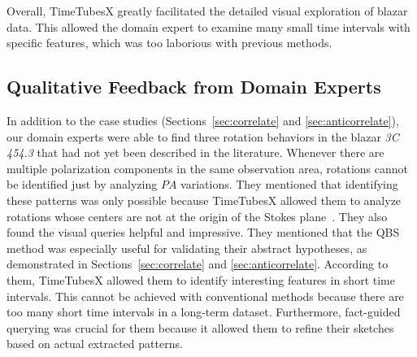 Overall, TimeTubesX greatly facilitated the detailed visual exploration of blazar data. This allowed the domain expert to examine many small time intervals with specific features, which was too laborious with previous methods.


\subsection{Qualitative Feedback from Domain Experts}
In addition to the case studies (Sections~\ref{sec:correlate} and \ref{sec:anticorrelate}),
our domain experts were able to find three rotation behaviors in the blazar \emph{3C 454.3} that had not yet been described in the literature. 
Whenever there are multiple polarization components in the same observation area, rotations cannot be identified just by analyzing $PA$ variations.
They mentioned that identifying these patterns was only possible because TimeTubesX allowed them to analyze rotations whose centers are not at the origin of the Stokes plane~\cite{Huang2019}. 
They also found the visual queries helpful and impressive. 
They mentioned that the QBS method was especially useful for validating their abstract hypotheses, as demonstrated in Sections~\ref{sec:correlate} and \ref{sec:anticorrelate}.
According to them, TimeTubesX allowed them to identify interesting features in short time intervals.
This cannot be achieved with conventional methods because there are too many short time intervals in a long-term dataset.
Furthermore, fact-guided querying was crucial for them because it allowed them to refine their sketches based on actual extracted patterns.